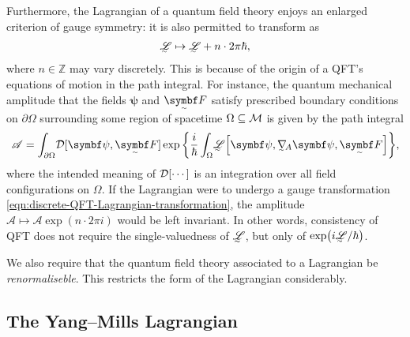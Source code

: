 Furthermore, the Lagrangian of a quantum field theory enjoys an enlarged criterion of gauge symmetry: it is also permitted to transform as
\begin{align}
	\LL \mapsto \LL + n\cdot2\pi\hbar
	\label{eqn:discrete-QFT-Lagrangian-transformation}
,\end{align}
where $n \in \mathds Z$ may vary discretely.
This is because of the origin of a QFT's equations of motion in the path integral.
For instance, the quantum mechanical amplitude that the fields $\bm\psi$ and $\tsbm F$ satisfy prescribed boundary conditions on $\partial\Omega$ surrounding some region of spacetime $\Omega \subseteq \cal M$ is given by the path integral
\begin{align}
	\mathscr A = \int_{\partial\Omega}\! \cal D[\bm\psi, \tsbm F] \exp\qty{\frac{i}{\hbar} \int_{\Omega}\! \LL\qty[\bm\psi, \ts\nabla_{\!A}\bm\psi, \tsbm F]}
,\end{align}
where the intended meaning of $\cal D[\cdots]$ is an integration over all field configurations on $\Omega$.
If the Lagrangian were to undergo a gauge transformation \eqref{eqn:discrete-QFT-Lagrangian-transformation}, the amplitude $\mathscr A \mapsto \mathscr A\exp(n\cdot2\pi i)$ would be left invariant.
In other words, consistency of QFT does not require the single-valuedness of $\LL$, but only of $\exp(i\LL/\hbar)$.


We also require that the quantum field theory associated to a Lagrangian be \emph{renormaliseble}.
This restricts the form of the Lagrangian considerably.


\subsection{The Yang--Mills Lagrangian}

